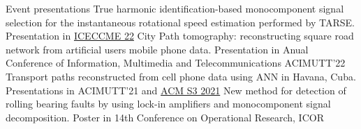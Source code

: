 \begin{rubric}{Event presentations}
\entry*[2022] True harmonic identification-based monocomponent signal selection for the instantaneous rotational speed estimation performed by TARSE. Presentation in \href{http://www.iceccme.com/2022/}{ICECCME 22}
 \entry*[2022]  City Path tomography: reconstructing square road network from artificial users mobile phone data. Presentation in Anual Conference of Information, Multimedia and Telecommunications ACIMUTT'22
 \entry*[2021]  Transport paths reconstructed from cell phone data using ANN in Havana, Cuba. Presentations in ACIMUTT'21 and \href{http://www.people.vcu.edu/~barahoueipash/S3/S3.html}{ACM S3 2021}
  \entry*[2020] New method for detection of rolling bearing faults by using lock-in amplifiers and monocomponent signal decomposition. Poster in 14th Conference on Operational Research, ICOR
\end{rubric}